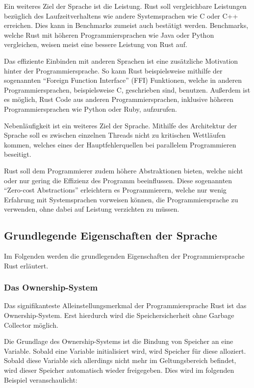 Ein weiteres Ziel der Sprache ist die Leistung. Rust soll vergleichbare Leistungen bezüglich des Laufzeitverhaltens wie andere
Systemsprachen wie C oder C++ erreichen.
Dies kann in Benchmarks zumeist auch bestätigt werden\cite{rustVsCBenchmark}. 
Benchmarks, welche Rust mit
höheren Programmiersprachen wie Java\cite{rustVsJavaBenchmark} oder Python\cite{rustVsPythonBenchmark} vergleichen,
weisen meist eine bessere Leistung von Rust auf.

Das effiziente Einbinden mit anderen Sprachen ist eine zusätzliche Motivation hinter der Programmiersprache.
So kann Rust beispielsweise mithilfe der sogenannten "`Foreign Function Interface"' (FFI)
Funktionen, welche in anderen Programmiersprachen, beispielsweise C, geschrieben sind, benutzen. Außerdem ist es möglich,
Rust Code aus anderen Programmiersprachen, inklusive höheren Programmiersprachen wie Python oder Ruby, aufzurufen.

Nebenläufigkeit ist ein weiteres Ziel der Sprache. Mithilfe des Architektur der Sprache soll es zwischen einzelnen Threads
nicht zu kritischen Wettläufen kommen, welches eines der Hauptfehlerquellen bei parallelem Programmieren beseitigt.

Rust soll dem Programmierer zudem höhere Abstraktionen bieten, welche nicht oder nur gering die Effizienz des Programm
beeinflussen. Diese sogenannten "`Zero-cost Abstractions"' erleichtern es Programmierern, welche nur wenig Erfahrung mit
Systemsprachen vorweisen können, die Programmiersprache zu verwenden, ohne dabei auf Leistung verzichten zu müssen.

\subsection{Grundlegende Eigenschaften der Sprache}

Im Folgenden werden die grundlegenden Eigenschaften der Programmiersprache Rust erläutert.

\subsubsection{Das Ownership-System}

Das signifikanteste Alleinstellungsmerkmal der Programmiersprache Rust ist das Ownership-System\cite{whatIsOwnership}.
Erst hierdurch wird die Speichersicherheit ohne Garbage Collector möglich.

Die Grundlage des Ownership-Systems ist die Bindung von Speicher an eine Variable\cite{whatIsOwnership}.
Sobald eine Variable initialisiert wird, wird Speicher für diese alloziert.
Sobald diese Variable sich allerdings nicht mehr im Geltungsbereich befindet,
wird dieser Speicher automatisch wieder freigegeben\cite{whatIsOwnership}.
Dies wird im folgenden Beispiel veranschaulicht\cite{ownership}:

